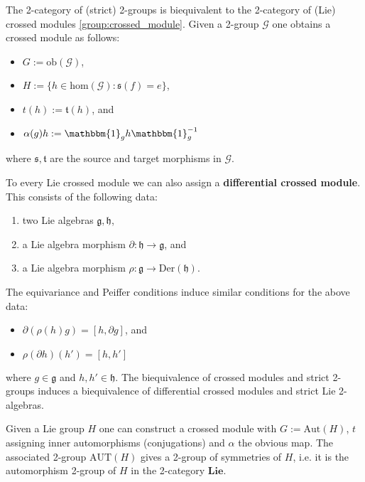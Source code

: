     \begin{property}
        The 2-category of (strict) 2-groups is biequivalent to the 2-category of (Lie) crossed modules \ref{group:crossed_module}. Given a 2-group $\mathcal{G}$ one obtains a crossed module as follows:
        \begin{itemize}
            \item $G:=\text{ob}(\mathcal{G})$,
            \item $H:=\{h\in\text{hom}(\mathcal{G}):\mathfrak{s}(f)=e\}$,
            \item $t(h):=\mathfrak{t}(h)$, and
            \item $\alpha(g)h := \mathbbm{1}_gh\mathbbm{1}_g^{-1}$
        \end{itemize}
        where $\mathfrak{s},\mathfrak{t}$ are the source and target morphisms in $\mathcal{G}$.

        To every Lie crossed module we can also assign a \textbf{differential crossed module}. This consists of the following data:
        \begin{enumerate}
            \item two Lie algebras $\mathfrak{g},\mathfrak{h}$,
            \item a Lie algebra morphism $\partial:\mathfrak{h}\rightarrow\mathfrak{g}$, and
            \item a Lie algebra morphism $\rho:\mathfrak{g}\rightarrow\text{Der}(\mathfrak{h})$.
        \end{enumerate}
        The equivariance and Peiffer conditions induce similar conditions for the above data:
        \begin{itemize}
            \item $\partial(\rho(h)g) = [h,\partial g]$, and
            \item $\rho(\partial h)(h') = [h,h']$
        \end{itemize}
        where $g\in\mathfrak{g}$ and $h,h'\in\mathfrak{h}$. The biequivalence of crossed modules and strict 2-groups induces a biequivalence of differential crossed modules and strict Lie 2-algebras.
    \end{property}

    \begin{example}
        Given a Lie group $H$ one can construct a crossed module with $G:=\text{Aut}(H)$, $t$ assigning inner automorphisms (conjugations) and $\alpha$ the obvious map. The associated 2-group $\text{AUT}(H)$ gives a 2-group of symmetries of $H$, i.e. it is the automorphism 2-group of $H$ in the 2-category $\mathbf{Lie}$.
    \end{example}

